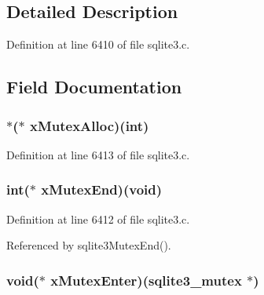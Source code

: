 \subsection{Detailed Description}


Definition at line 6410 of file sqlite3.\+c.



\subsection{Field Documentation}
\hypertarget{structsqlite3__mutex__methods_aff1d38bb0f2150fdf62ff87c241bd76e}{}
\subsubsection[{x\+Mutex\+Alloc}]{ $\ast$($\ast$ x\+Mutex\+Alloc)(int)}\label{structsqlite3__mutex__methods_aff1d38bb0f2150fdf62ff87c241bd76e}


Definition at line 6413 of file sqlite3.\+c.

\hypertarget{structsqlite3__mutex__methods_ac92c39796f740decb37d5b6040f7eece}{}
\subsubsection[{x\+Mutex\+End}]{\setlength{\rightskip}{0pt plus 5cm}int($\ast$ x\+Mutex\+End)(void)}\label{structsqlite3__mutex__methods_ac92c39796f740decb37d5b6040f7eece}


Definition at line 6412 of file sqlite3.\+c.



Referenced by sqlite3\+Mutex\+End().

\hypertarget{structsqlite3__mutex__methods_a7d4855948658b13b5f171b63f485a1aa}{}
\subsubsection[{x\+Mutex\+Enter}]{\setlength{\rightskip}{0pt plus 5cm}void($\ast$ x\+Mutex\+Enter)({\bf sqlite3\+\_\+mutex} $\ast$)}\label{structsqlite3__mutex__methods_a7d4855948658b13b5f171b63f485a1aa}


